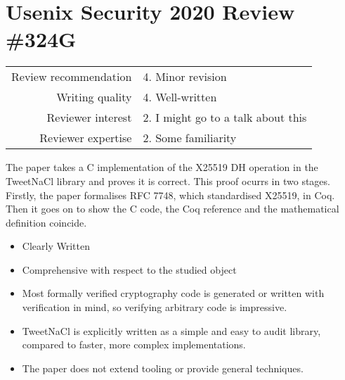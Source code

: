 \newpage
\section{Usenix Security 2020 Review \#324G}

\begin{tabular}{rl}
    \toprule
    Review recommendation & 4. Minor revision                  \\
    Writing quality       & 4. Well-written                    \\
    Reviewer interest     & 2. I might go to a talk about this \\
    Reviewer expertise    & 2. Some familiarity                \\
    \bottomrule
\end{tabular}

\begin{center}
\end{center}
The paper takes a C implementation of the X25519 DH operation in the TweetNaCl library and proves it is correct. This proof ocurrs in two stages. Firstly, the paper formalises RFC 7748, which standardised X25519, in Coq. Then it goes on to show the C code, the Coq reference and the mathematical definition coincide.

\begin{center}
\end{center}

\begin{itemize}
    \item Clearly Written
    \item Comprehensive with respect to the studied object
    \item Most formally verified cryptography code is generated or written with verification in mind, so verifying arbitrary code is impressive.
\end{itemize}

\begin{center}
\end{center}

\begin{itemize}
    \item TweetNaCl is explicitly written as a simple and easy to audit library, compared to faster, more complex implementations.
    \item The paper does not extend tooling or provide general techniques.
\end{itemize}

